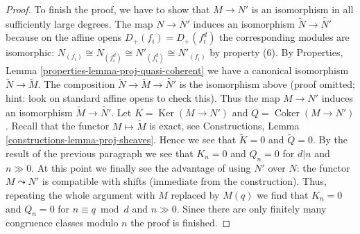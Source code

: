 \documentclass[10pt,a4paper]{amsart}
\theoremstyle{plain}
\theoremstyle{definition}
\theoremstyle{remark}
\numberwithin{equation}{subsection}
\def\Ker{\mathop{\mathrm{Ker}}}
\def\Coker{\mathop{\mathrm{Coker}}}
\begin{document}
\begin{proof}
\medskip\noindent
To finish the proof, we have to show that $M \to N'$ is an isomorphism
in all sufficiently large degrees. The map $N \to N'$ induces an
isomorphism $\widetilde{N} \to \widetilde{N'}$ because on the affine
opens $D_+(f_i) = D_+(f_i^d)$ the corresponding modules are isomorphic:
$N_{(f_i)} \cong N_{(f_i^d)} \cong N'_{(f_i^d)} \cong N'_{(f_i)}$
by property (6).
By Properties, Lemma \ref{properties-lemma-proj-quasi-coherent}
we have a canonical isomorphism $\widetilde{N} \to \widetilde{M}$.
The composition $\widetilde{N} \to \widetilde{M} \to \widetilde{N'}$
is the isomorphism above (proof omitted; hint: look on standard
affine opens to check this). Thus the map $M \to N'$ induces an isomorphism
$\widetilde{M} \to \widetilde{N'}$.
Let $K = \Ker(M \to N')$ and $Q = \Coker(M \to N')$.
Recall that the functor
$M \mapsto \widetilde{M}$ is exact, see
Constructions, Lemma \ref{constructions-lemma-proj-sheaves}.
Hence we see that $\widetilde{K} = 0$ and $\widetilde{Q} = 0$.
By the result of the previous paragraph we see that $K_n = 0$ and
$Q_n = 0$ for $d | n$ and $n \gg 0$. At this point we finally see
the advantage of using $N'$ over $N$: the functor $M \leadsto N'$
is compatible with shifts (immediate from the construction).
Thus, repeating the whole argument with $M$ replaced by $M(q)$
we find that $K_n = 0$ and $Q_n = 0$ for $n \equiv q \bmod d$
and $n \gg 0$. Since there are
only finitely many congruence classes modulo $n$ the proof is finished.
\end{proof}
\end{document}
